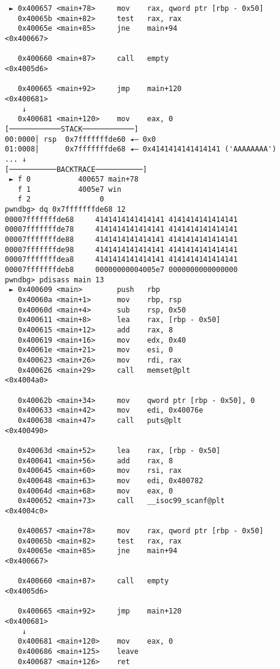 \begin{lstlisting}
 ► 0x400657 <main+78>     mov    rax, qword ptr [rbp - 0x50]
   0x40065b <main+82>     test   rax, rax
   0x40065e <main+85>     jne    main+94                       <0x400667>
 
   0x400660 <main+87>     call   empty                         <0x4005d6>
 
   0x400665 <main+92>     jmp    main+120                      <0x400681>
    ↓
   0x400681 <main+120>    mov    eax, 0
[────────────STACK────────────]
00:0000│ rsp  0x7fffffffde60 ◂— 0x0
01:0008│      0x7fffffffde68 ◂— 0x4141414141414141 ('AAAAAAAA')
... ↓
[───────────BACKTRACE───────────]
 ► f 0           400657 main+78
   f 1           4005e7 win
   f 2                0
pwndbg> dq 0x7fffffffde68 12
00007fffffffde68     4141414141414141 4141414141414141
00007fffffffde78     4141414141414141 4141414141414141
00007fffffffde88     4141414141414141 4141414141414141
00007fffffffde98     4141414141414141 4141414141414141
00007fffffffdea8     4141414141414141 4141414141414141
00007fffffffdeb8     00000000004005e7 0000000000000000
pwndbg> pdisass main 13
 ► 0x400609 <main>        push   rbp
   0x40060a <main+1>      mov    rbp, rsp
   0x40060d <main+4>      sub    rsp, 0x50
   0x400611 <main+8>      lea    rax, [rbp - 0x50]
   0x400615 <main+12>     add    rax, 8
   0x400619 <main+16>     mov    edx, 0x40
   0x40061e <main+21>     mov    esi, 0
   0x400623 <main+26>     mov    rdi, rax
   0x400626 <main+29>     call   memset@plt                    <0x4004a0>
 
   0x40062b <main+34>     mov    qword ptr [rbp - 0x50], 0
   0x400633 <main+42>     mov    edi, 0x40076e
   0x400638 <main+47>     call   puts@plt                      <0x400490>
 
   0x40063d <main+52>     lea    rax, [rbp - 0x50]
   0x400641 <main+56>     add    rax, 8
   0x400645 <main+60>     mov    rsi, rax
   0x400648 <main+63>     mov    edi, 0x400782
   0x40064d <main+68>     mov    eax, 0
   0x400652 <main+73>     call   __isoc99_scanf@plt            <0x4004c0>
 
   0x400657 <main+78>     mov    rax, qword ptr [rbp - 0x50]
   0x40065b <main+82>     test   rax, rax
   0x40065e <main+85>     jne    main+94                       <0x400667>
 
   0x400660 <main+87>     call   empty                         <0x4005d6>
 
   0x400665 <main+92>     jmp    main+120                      <0x400681>
    ↓
   0x400681 <main+120>    mov    eax, 0
   0x400686 <main+125>    leave  
   0x400687 <main+126>    ret    
 

\end{lstlisting}
